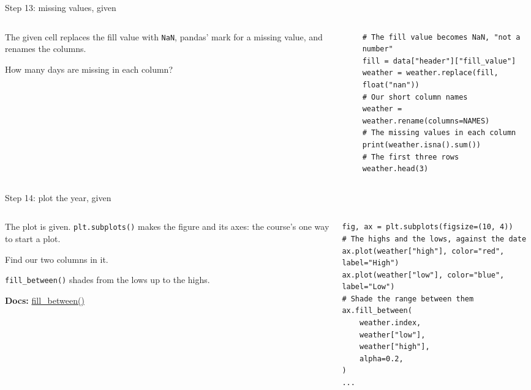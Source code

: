 \documentclass[9pt,aspectratio=169]{beamer}
\begin{document}
\begin{frame}[fragile]{Step 13: missing values, given}
    \begin{columns}[T]
        \begin{column}{0.37\textwidth}
            The given cell replaces the fill value with \texttt{NaN}, pandas' mark for a missing value, and renames the columns.

            \medskip
            How many days are missing in each column?
        \end{column}
        \begin{column}{0.6\textwidth}
\begin{lstlisting}
# The fill value becomes NaN, "not a number"
fill = data["header"]["fill_value"]
weather = weather.replace(fill, float("nan"))
# Our short column names
weather = weather.rename(columns=NAMES)
# The missing values in each column
print(weather.isna().sum())
# The first three rows
weather.head(3)
\end{lstlisting}
        \end{column}
    \end{columns}
\end{frame}

\begin{frame}[fragile]{Step 14: plot the year, given}
    \begin{columns}[T]
        \begin{column}{0.37\textwidth}
            The plot is given. \texttt{plt.subplots()} makes the figure and its axes: the course's one way to start a plot.

            \medskip
            Find our two columns in it.

            \medskip
            \texttt{fill\_between()} shades from the lows up to the highs.

            \medskip
            {\scriptsize\textbf{Docs:} \href{https://matplotlib.org/stable/api/_as_gen/matplotlib.axes.Axes.fill_between.html}{fill\_between()}\par}
        \end{column}
        \begin{column}{0.6\textwidth}
\begin{lstlisting}
fig, ax = plt.subplots(figsize=(10, 4))
# The highs and the lows, against the date
ax.plot(weather["high"], color="red", label="High")
ax.plot(weather["low"], color="blue", label="Low")
# Shade the range between them
ax.fill_between(
    weather.index,
    weather["low"],
    weather["high"],
    alpha=0.2,
)
...
\end{lstlisting}
        \end{column}
    \end{columns}
\end{frame}
\end{document}

